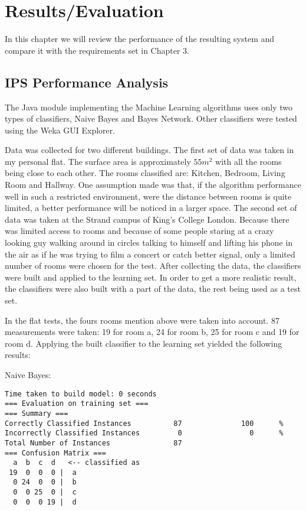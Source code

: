 \chapter{Results/Evaluation}
In this chapter we will review the performance of the resulting system and compare it with the requirements set in Chapter 3.
\section{IPS Performance Analysis}

The Java module implementing the Machine Learning algorithms uses only two types of classifiers, Naive Bayes and Bayes Network. Other classifiers were tested using the Weka GUI Explorer. 

Data was collected for two different buildings. The first set of data was taken in my personal flat. The surface area is approximately $55 m^2$ with all the rooms being close to each other. The rooms classified are: Kitchen, Bedroom, Living Room and Hallway. One assumption made was that, if the algorithm performance well in such a restricted environment, were the distance between rooms is quite limited, a better performance will be noticed in a larger space. The second set of data was taken at the Strand campus of King's College London. Because there was limited access to rooms and because of some people staring at a crazy looking guy walking around in circles talking to himself and lifting his phone in the air as if he was trying to film a concert or catch better signal, only a limited number of rooms were chosen for the test. After collecting the data, the classifiers were built and applied to the learning set. In order to get a more realistic result, the classifiers were also built with a part of the data, the rest being used as a test set.

In the flat tests, the fours rooms mention above were taken into account. 87 measurements were taken: 19 for room a, 24 for room b, 25 for room c and 19 for room d. Applying the built classifier to the learning set yielded the following results:

\noindent Naive Bayes:
\begin{lstlisting}
Time taken to build model: 0 seconds
=== Evaluation on training set ===
=== Summary ===
Correctly Classified Instances          87              100      %
Incorrectly Classified Instances         0                0      %
Total Number of Instances               87     
=== Confusion Matrix ===
  a  b  c  d   <-- classified as
 19  0  0  0 |  a
  0 24  0  0 |  b
  0  0 25  0 |  c
  0  0  0 19 |  d
\end{lstlisting}

